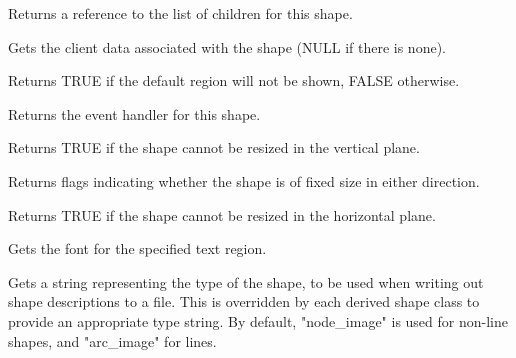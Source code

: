 

Returns a reference to the list of children for this shape.



Gets the client data associated with the shape (NULL if there is
none).



Returns TRUE if the default region will not be shown, FALSE otherwise.



Returns the event handler for this shape.



Returns TRUE if the shape cannot be resized in the vertical plane.



Returns flags indicating whether the shape is of fixed size in either direction.



Returns TRUE if the shape cannot be resized in the horizontal plane.



Gets the font for the specified text region.



Gets a string representing the type of the shape, to be used when
writing out shape descriptions to a file. This is overridden by
each derived shape class to provide an appropriate type string. By default,
"node\_image" is used for non-line shapes, and "arc\_image" for lines.

